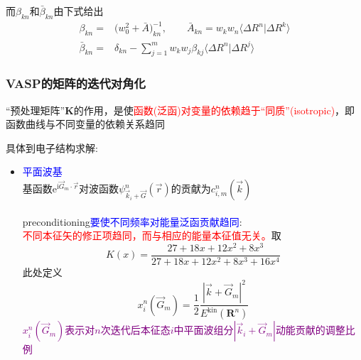 {\begin{itemize}
\begin{displaymath}
	\end{displaymath}
	而$\beta_{kn}$和$\bar\beta_{kn}$由下式给出
	\begin{displaymath}
		\begin{aligned}
			\beta_{kn}=&\big(w_0^2+\bar A\big)_{kn}^{-1},\qquad \bar A_{kn}=w_kw_n\langle\Delta R^n|\Delta R^k\rangle\\
			\bar\beta_{kn}=&\delta_{kn}-\sum_{j=1}^mw_kw_j\beta_{kj}\langle\Delta R^n|\Delta R^j\rangle
		\end{aligned}
	\end{displaymath}
		{\fontsize{7.2pt}{4.2pt}}
	\end{itemize}
}

\frame
{
	\frametitle{\textrm{VASP}的矩阵的迭代对角化}
	``预处理矩阵''$\mathbf{K}$的作用，是使\textcolor{red}{函数(泛函)对变量的依赖趋于“同质”(\textrm{isotropic})}，即函数曲线与不同变量的依赖关系趋同

	具体到电子结构求解:~
	\begin{itemize}
		\item \textcolor{blue}{平面波基}\\
			基函数$\mathrm{e}^{\mathrm{i}\vec G_m\cdot\vec r}$对波函数$\psi_{\vec k_i+\vec G}^n(\vec r)$的贡献为$c_{i,m}^n(\vec k)$\\
		{\fontsize{7.2pt}{4.2pt}\selectfont{
		在能量泛函表达式中，高频(大的$\vec G_m$)部分比低频(小的$\vec G_m$)贡献大得多}}\\
			\textrm{preconditioning}\textcolor{blue}{要使不同频率对能量泛函贡献趋同}:\\
			\textcolor{red}{不同本征矢的修正项趋同，而与相应的能量本征值无关。}取
	\begin{displaymath}
		K(x)=\dfrac{27+18x+12x^2+8x^3}{27+18x+12x^2+8x^3+16x^4}
	\end{displaymath}
	此处定义
	\begin{displaymath}
		x_i^n(\vec G_m)=\dfrac12\dfrac{|\vec k+\vec G_m|^2}{E^{\mathrm{kin}}(\mathbf{R}^n)}
	\end{displaymath}
	\textcolor{purple}{$x_i^n(\vec G_m)$表示对$n$次迭代后本征态$i$中平面波组分$|\vec k_i+\vec G_m|$动能贡献的调整比例}
	\end{itemize}
}

